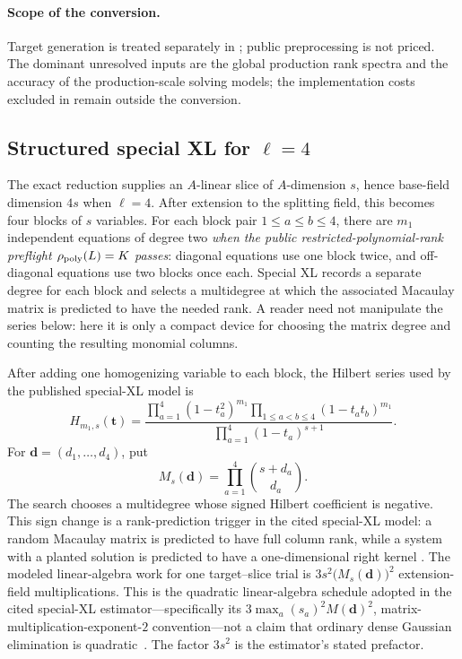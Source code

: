 \documentclass[11pt]{article}
\begin{document}
\paragraph{Scope of the conversion.}
Target generation is treated separately in ;
public preprocessing is not priced.  The dominant unresolved inputs are the
global production rank spectra and the accuracy of the production-scale
solving models; the implementation costs excluded in
 remain outside the conversion.

\subsection{Structured special XL for \texorpdfstring{$\ell=4$}{l=4}}\label{sec:special-xl}

The exact reduction supplies an $A$-linear slice of $A$-dimension $s$,
hence base-field dimension $4s$ when $\ell=4$.  After extension to the
splitting field, this becomes four blocks of $s$ variables.  For each block
pair $1\le a\le b\le4$, there are $m_1$ independent equations
of degree two \emph{when the public restricted-polynomial-rank preflight
$\rho_{\rm poly}(L)=K$ passes}: diagonal equations use one block twice, and off-diagonal
equations use two blocks once each.  Special XL records a separate degree for
each block and selects a multidegree
at which the associated Macaulay matrix is predicted to have the needed rank.
A reader need not manipulate the series below: here it is only a compact device
for choosing the matrix degree and counting the resulting monomial columns.

After adding one homogenizing variable to each block, the Hilbert series used
by the published special-XL model is
\begin{equation}\label{eq:hilbert-series}
 H_{m_1,s}(\mathbf t)=
 \frac{\prod_{a=1}^{4}(1-t_a^2)^{m_1}
       \prod_{1\le a<b\le4}(1-t_at_b)^{m_1}}
      {\prod_{a=1}^{4}(1-t_a)^{s+1}}.
\end{equation}
For $\mathbf d=(d_1,\ldots,d_4)$, put
\begin{equation}\label{eq:macaulay-size}
 M_s(\mathbf d)=\prod_{a=1}^{4}\binom{s+d_a}{d_a}.
\end{equation}
The search chooses a multidegree whose signed Hilbert coefficient is
negative.  This sign change is a rank-prediction trigger in the cited
special-XL model: a random Macaulay matrix is predicted to have full column
rank, while a system with a planted solution is predicted to have a
one-dimensional right kernel
\cite{Cabarcas2025SNOVA}.  The modeled linear-algebra work for one target--slice trial is
$3s^2\bigl(M_s(\mathbf d)\bigr)^2$ extension-field multiplications.  This is
the quadratic linear-algebra schedule adopted in the cited special-XL
estimator---specifically its $3\max_a(s_a)^2M(\mathbf d)^2$,
matrix-multiplication-exponent-$2$ convention---not a claim that ordinary
dense Gaussian elimination is quadratic~\cite{Cabarcas2025SNOVA}.  The factor
$3s^2$ is the estimator's stated prefactor.
\end{document}
